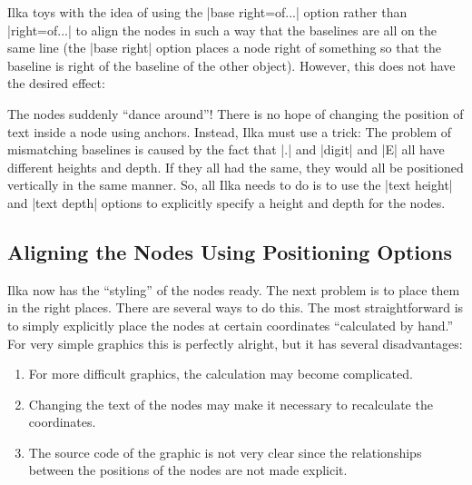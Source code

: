 Ilka toys with the idea of using the |base right=of...| option rather than
|right=of...| to align the nodes in such a way that the baselines
are all on the same line (the |base right| option places a node
right of something so that the baseline is right of the baseline of
the other object). However, this does not have the desired effect:
\begin{codeexample}[]
\end{codeexample}
The nodes suddenly ``dance around''! There is no hope of changing the
position of text inside a node using anchors. Instead, Ilka must use a
trick: The problem of mismatching baselines is caused by the fact that
|.| and |digit| and |E| all have different heights and depth. If they
all had the same, they would all be positioned vertically in the same
manner. So, all Ilka needs to do is to use the |text height| and
|text depth| options to explicitly specify a height and depth for the
nodes.
\begin{codeexample}[]
\end{codeexample}



\subsection{Aligning  the Nodes Using Positioning Options}

Ilka now has the ``styling'' of the nodes ready. The next problem is
to place them in the right places. There are several ways to do
this. The most straightforward is to simply explicitly place the nodes
at certain coordinates ``calculated by hand.'' For very simple
graphics this is perfectly alright, but it has several disadvantages:
\begin{enumerate}
\item For more difficult graphics, the calculation may become
  complicated.
\item Changing the text of the nodes may make it necessary to
  recalculate the coordinates.
\item The source code of the graphic is not very clear since the
  relationships between the positions of the nodes are not made
  explicit.
\end{enumerate}

